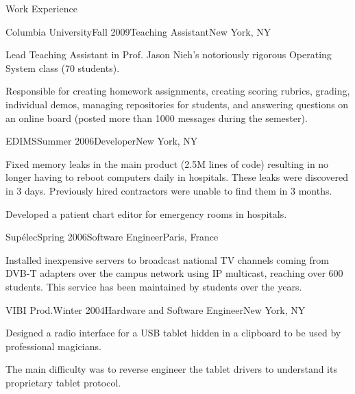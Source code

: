 \documentclass{resume} %
\newcommand{\supelec}{{Sup\'{e}lec}\xspace}
\begin{document}
\begin{rSection}{Work Experience}
\begin{rSubsection}{Columbia University}{Fall 2009}{Teaching Assistant}{New York, NY}
\item Lead Teaching Assistant in Prof. Jason Nieh's notoriously rigorous Operating System class (70 students).
\item Responsible for creating homework assignments, creating scoring rubrics, grading,
individual demos, managing repositories for students, and answering questions on an online board (posted more
than 1000 messages during the semester).
\end{rSubsection}

\begin{rSubsection}{EDIMS}{Summer 2006}{Developer}{New York, NY}
\item Fixed memory leaks in the main product (2.5M lines of code)
      resulting in no longer having to reboot computers daily in hospitals.
      These leaks were discovered in 3 days. Previously hired contractors were unable to find them in 3 months.


\item Developed a patient chart editor for emergency rooms in hospitals.
\end{rSubsection}

\begin{rSubsection}{\supelec}{Spring 2006}{Software Engineer}{Paris, France}
\item Installed inexpensive servers to broadcast national TV channels coming
      from DVB-T adapters over the campus network using IP multicast,
      reaching over 600 students. This service has been maintained by students over
      the years.
\end{rSubsection}

\begin{rSubsection}{VIBI Prod.}{Winter 2004}{Hardware and Software Engineer}{New York, NY}
\item Designed a radio interface for a USB tablet hidden in a clipboard to be used by professional magicians.
\item The main difficulty was to reverse engineer the tablet drivers to understand its proprietary tablet protocol.
\end{rSubsection}


\end{rSection}
\end{document}
